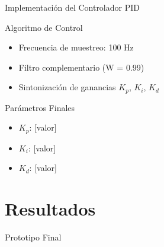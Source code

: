 \documentclass[10pt,xcolor={dvipsnames}]{beamer}
\begin{document}
\begin{frame}{Implementación del Controlador PID}
\begin{block}{Algoritmo de Control}
\begin{itemize}
    \item Frecuencia de muestreo: 100 Hz
    \item Filtro complementario (W = 0.99)
    \item Sintonización de ganancias $K_p$, $K_i$, $K_d$
\end{itemize}
\end{block}

\begin{center}
\end{center}

\vspace{0.3cm}
\begin{alertblock}{Parámetros Finales}
\begin{itemize}
    \item $K_p$: [valor]
    \item $K_i$: [valor]
    \item $K_d$: [valor]
\end{itemize}
\end{alertblock}
\end{frame}

\section{Resultados}

\begin{frame}{Prototipo Final}
\begin{center}
\end{center}

\vspace{0.3cm}
\begin{columns}

\end{columns}
\end{frame}
\end{document}
